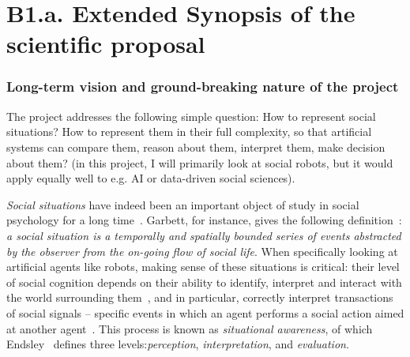 
\newrefsection


\chapter{B1.a. Extended Synopsis of the scientific proposal}\label{part1}




\subsection{Long-term vision and ground-breaking nature of the project}

The \project project addresses the following simple question: How to
represent social situations? How to represent them in their full complexity, so
that artificial systems can compare them, reason about them, interpret them,
make decision about them? (in this project, I will primarily look at social
robots, but it would apply equally well to e.g. AI or data-driven social
sciences).

\emph{Social situations} have indeed been an important object of study in social
psychology for a long time~\cite{argyle1981social}. Garbett, for instance, gives
the following definition~\cite{garbett1970analysis}: \emph{a social situation is
a temporally and spatially bounded series of events abstracted by the observer
from the on-going flow of social life}. When specifically looking at artificial
agents like robots, making sense of these situations is critical: their level of
social cognition depends on their ability to identify, interpret and interact
with the world surrounding them~\cite{szczepanowski2017computational}, and in
particular, correctly interpret transactions of social signals -- specific
events in which an agent performs a social action aimed at another
agent~\cite{pantic2011social}. This process is known as \textit{situational
awareness}, of which Endsley~\cite{endsley1995theory} defines three
levels:\emph{perception}, \emph{interpretation}, and \emph{evaluation}.

